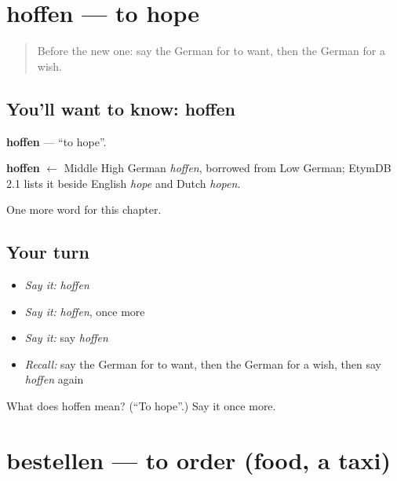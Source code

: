 \section[hoffen]{hoffen — to hope}

\label{lesson:GE-C136-hoffen}



\begin{quote}
Before the new one: say the German for to want, then the German for a wish.
\end{quote}

\subsection*{You'll want to know: hoffen}
\textbf{hoffen} — \textquotedblleft{}to hope\textquotedblright{}.

\begin{cousinweb}
\textbf{hoffen} $\leftarrow$ Middle High German \emph{hoffen}, borrowed from Low German; EtymDB 2.1 lists it beside English \emph{hope} and Dutch \emph{hopen}.
\end{cousinweb}

\begin{grammarlens}[title={What you've built}]
One more word for this chapter.
\end{grammarlens}

\subsection*{Your turn}
\begin{itemize}
\raggedright
  \item \emph{Say it:} \emph{hoffen}
  \item \emph{Say it:} \emph{hoffen}, once more
  \item \emph{Say it:} say \emph{hoffen}
  \item \emph{Recall:} say the German for to want, then the German for a wish, then say \emph{hoffen} again
\end{itemize}

\begin{tcolorbox}[breakable,colback=teal!4,colframe=teal!35!black,title={Before you move on}]
What does hoffen mean? (\textquotedblleft{}To hope\textquotedblright{}.) Say it once more.
\end{tcolorbox}
\section[bestellen]{bestellen — to order (food, a taxi)}

